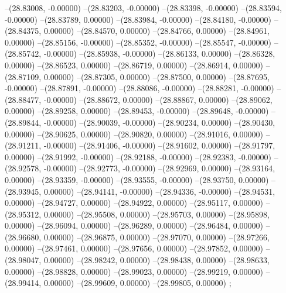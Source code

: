 --(28.83008, -0.00000)
--(28.83203, -0.00000)
--(28.83398, -0.00000)
--(28.83594, -0.00000)
--(28.83789, 0.00000)
--(28.83984, -0.00000)
--(28.84180, -0.00000)
--(28.84375, 0.00000)
--(28.84570, 0.00000)
--(28.84766, 0.00000)
--(28.84961, 0.00000)
--(28.85156, -0.00000)
--(28.85352, -0.00000)
--(28.85547, -0.00000)
--(28.85742, -0.00000)
--(28.85938, -0.00000)
--(28.86133, 0.00000)
--(28.86328, 0.00000)
--(28.86523, 0.00000)
--(28.86719, 0.00000)
--(28.86914, 0.00000)
--(28.87109, 0.00000)
--(28.87305, 0.00000)
--(28.87500, 0.00000)
--(28.87695, -0.00000)
--(28.87891, -0.00000)
--(28.88086, -0.00000)
--(28.88281, -0.00000)
--(28.88477, -0.00000)
--(28.88672, 0.00000)
--(28.88867, 0.00000)
--(28.89062, 0.00000)
--(28.89258, 0.00000)
--(28.89453, -0.00000)
--(28.89648, -0.00000)
--(28.89844, -0.00000)
--(28.90039, -0.00000)
--(28.90234, 0.00000)
--(28.90430, 0.00000)
--(28.90625, 0.00000)
--(28.90820, 0.00000)
--(28.91016, 0.00000)
--(28.91211, -0.00000)
--(28.91406, -0.00000)
--(28.91602, 0.00000)
--(28.91797, 0.00000)
--(28.91992, -0.00000)
--(28.92188, -0.00000)
--(28.92383, -0.00000)
--(28.92578, -0.00000)
--(28.92773, -0.00000)
--(28.92969, 0.00000)
--(28.93164, 0.00000)
--(28.93359, -0.00000)
--(28.93555, -0.00000)
--(28.93750, 0.00000)
--(28.93945, 0.00000)
--(28.94141, -0.00000)
--(28.94336, -0.00000)
--(28.94531, 0.00000)
--(28.94727, 0.00000)
--(28.94922, 0.00000)
--(28.95117, 0.00000)
--(28.95312, 0.00000)
--(28.95508, 0.00000)
--(28.95703, 0.00000)
--(28.95898, 0.00000)
--(28.96094, 0.00000)
--(28.96289, 0.00000)
--(28.96484, 0.00000)
--(28.96680, 0.00000)
--(28.96875, 0.00000)
--(28.97070, 0.00000)
--(28.97266, 0.00000)
--(28.97461, 0.00000)
--(28.97656, 0.00000)
--(28.97852, 0.00000)
--(28.98047, 0.00000)
--(28.98242, 0.00000)
--(28.98438, 0.00000)
--(28.98633, 0.00000)
--(28.98828, 0.00000)
--(28.99023, 0.00000)
--(28.99219, 0.00000)
--(28.99414, 0.00000)
--(28.99609, 0.00000)
--(28.99805, 0.00000)
;
